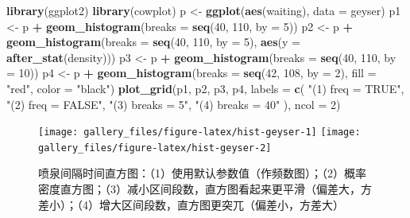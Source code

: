 \documentclass[
  b5paper,
  UTF8,twoside]{book}
\newenvironment{Shaded}{\begin{snugshade}}{\end{snugshade}}
\newcommand{\AttributeTok}[1]{\textcolor[rgb]{0.13,0.29,0.53}{#1}}
\newcommand{\DecValTok}[1]{\textcolor[rgb]{0.00,0.00,0.81}{#1}}
\newcommand{\FunctionTok}[1]{\textcolor[rgb]{0.13,0.29,0.53}{\textbf{#1}}}
\newcommand{\NormalTok}[1]{#1}
\newcommand{\OtherTok}[1]{\textcolor[rgb]{0.56,0.35,0.01}{#1}}
\newcommand{\SpecialCharTok}[1]{\textcolor[rgb]{0.81,0.36,0.00}{\textbf{#1}}}
\newcommand{\StringTok}[1]{\textcolor[rgb]{0.31,0.60,0.02}{#1}}
\begin{document}
\begin{Shaded}
\begin{Highlighting}[]
\FunctionTok{library}\NormalTok{(ggplot2)}
\FunctionTok{library}\NormalTok{(cowplot)}
\NormalTok{p }\OtherTok{\textless{}{-}} \FunctionTok{ggplot}\NormalTok{(}\FunctionTok{aes}\NormalTok{(waiting), }\AttributeTok{data =}\NormalTok{ geyser)}
\NormalTok{p1 }\OtherTok{\textless{}{-}}\NormalTok{ p }\SpecialCharTok{+} \FunctionTok{geom\_histogram}\NormalTok{(}\AttributeTok{breaks =} \FunctionTok{seq}\NormalTok{(}\DecValTok{40}\NormalTok{, }\DecValTok{110}\NormalTok{, }\AttributeTok{by =} \DecValTok{5}\NormalTok{))}
\NormalTok{p2 }\OtherTok{\textless{}{-}}\NormalTok{ p }\SpecialCharTok{+} \FunctionTok{geom\_histogram}\NormalTok{(}\AttributeTok{breaks =} \FunctionTok{seq}\NormalTok{(}\DecValTok{40}\NormalTok{, }\DecValTok{110}\NormalTok{, }\AttributeTok{by =} \DecValTok{5}\NormalTok{), }\FunctionTok{aes}\NormalTok{(}\AttributeTok{y =} \FunctionTok{after\_stat}\NormalTok{(density)))}
\NormalTok{p3 }\OtherTok{\textless{}{-}}\NormalTok{ p }\SpecialCharTok{+} \FunctionTok{geom\_histogram}\NormalTok{(}\AttributeTok{breaks =} \FunctionTok{seq}\NormalTok{(}\DecValTok{40}\NormalTok{, }\DecValTok{110}\NormalTok{, }\AttributeTok{by =} \DecValTok{10}\NormalTok{))}
\NormalTok{p4 }\OtherTok{\textless{}{-}}\NormalTok{ p }\SpecialCharTok{+} \FunctionTok{geom\_histogram}\NormalTok{(}\AttributeTok{breaks =} \FunctionTok{seq}\NormalTok{(}\DecValTok{42}\NormalTok{, }\DecValTok{108}\NormalTok{, }\AttributeTok{by =} \DecValTok{2}\NormalTok{), }\AttributeTok{fill =} \StringTok{"red"}\NormalTok{, }\AttributeTok{color =} \StringTok{"black"}\NormalTok{)}
\FunctionTok{plot\_grid}\NormalTok{(p1, p2, p3, p4, }\AttributeTok{labels =} \FunctionTok{c}\NormalTok{(}
  \StringTok{"(1) freq = TRUE"}\NormalTok{,}
  \StringTok{"(2) freq = FALSE"}\NormalTok{,}
  \StringTok{"(3) breaks = 5"}\NormalTok{,}
  \StringTok{"(4) breaks = 40"}
\NormalTok{), }\AttributeTok{ncol =} \DecValTok{2}\NormalTok{)}
\end{Highlighting}
\end{Shaded}

\begin{figure}

{\centering \texttt{[image: gallery\_files/figure-latex/hist-geyser-1]} \texttt{[image: gallery\_files/figure-latex/hist-geyser-2]} 

}

\caption[喷泉间隔时间直方图]{喷泉间隔时间直方图：（1）使用默认参数值（作频数图）；（2）概率密度直方图；（3）减小区间段数，直方图看起来更平滑（偏差大，方差小）；（4）增大区间段数，直方图更突兀（偏差小，方差大）}\label{fig:hist-geyser}
\end{figure}
\end{document}
